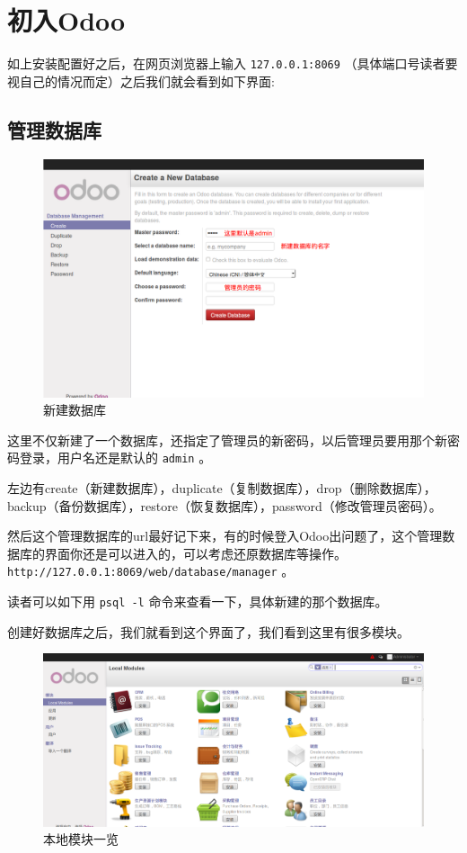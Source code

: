 \documentclass[11pt,a4paper]{sphinxmanual}
\begin{document}
\chapter{初入Odoo}
\label{sec-4}
如上安装配置好之后，在网页浏览器上输入 \verb~127.0.0.1:8069~ （具体端口号读者要视自己的情况而定）之后我们就会看到如下界面:

\section{管理数据库}
\label{sec-4-1}
\begin{figure}[H]
\centering
\includegraphics[keepaspectratio,max width=0.95\linewidth]{images/新建数据库.png}
\caption{新建数据库}
\end{figure}

这里不仅新建了一个数据库，还指定了管理员的新密码，以后管理员要用那个新密码登录，用户名还是默认的 \verb~admin~ 。

左边有create（新建数据库），duplicate（复制数据库），drop（删除数据库），backup（备份数据库），restore（恢复数据库），password（修改管理员密码）。

然后这个管理数据库的url最好记下来，有的时候登入Odoo出问题了，这个管理数据库的界面你还是可以进入的，可以考虑还原数据库等操作。 \verb~http://127.0.0.1:8069/web/database/manager~ 。

读者可以如下用 \verb~psql -l~ 命令来查看一下，具体新建的那个数据库。

创建好数据库之后，我们就看到这个界面了，我们看到这里有很多模块。

\begin{figure}[H]
\centering
\includegraphics[keepaspectratio,max width=0.95\linewidth]{images/本地模块一览.png}
\caption{本地模块一览}
\end{figure}
\end{document}
